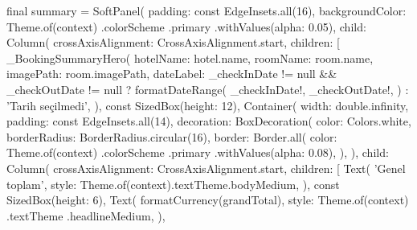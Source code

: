 \documentclass[11pt,a4paper]{article}
\begin{document}
\begin{codeblock}
{{{{                      final summary = SoftPanel(
                        padding: const EdgeInsets.all(16),
                        backgroundColor: Theme.of(context)
                            .colorScheme
                            .primary
                            .withValues(alpha: 0.05),
                        child: Column(
                          crossAxisAlignment: CrossAxisAlignment.start,
                          children: [
                            _BookingSummaryHero(
                              hotelName: hotel.name,
                              roomName: room.name,
                              imagePath: room.imagePath,
                              dateLabel:
                                  _checkInDate != null && _checkOutDate != null
                                      ? formatDateRange(
                                          _checkInDate!,
                                          _checkOutDate!,
                                        )
                                      : 'Tarih seçilmedi',
                            ),
                            const SizedBox(height: 12),
                            Container(
                              width: double.infinity,
                              padding: const EdgeInsets.all(14),
                              decoration: BoxDecoration(
                                color: Colors.white,
                                borderRadius: BorderRadius.circular(16),
                                border: Border.all(
                                  color: Theme.of(context)
                                      .colorScheme
                                      .primary
                                      .withValues(alpha: 0.08),
                                ),
                              ),
                              child: Column(
                                crossAxisAlignment: CrossAxisAlignment.start,
                                children: [
                                  Text(
                                    'Genel toplam',
                                    style:
                                        Theme.of(context).textTheme.bodyMedium,
                                  ),
                                  const SizedBox(height: 6),
                                  Text(
                                    formatCurrency(grandTotal),
                                    style: Theme.of(context)
                                        .textTheme
                                        .headlineMedium,
                                  ),
}}}}
\end{codeblock}
\end{document}
